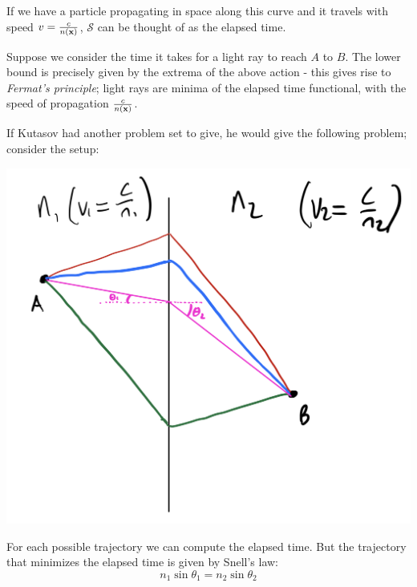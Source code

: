 If we have a particle propagating in space along this curve and it travels with speed $v = \frac{c}{n(\mathbf{x})}$, $\mathcal{S}$ can be thought of as the elapsed time.

Suppose we consider the time it takes for a light ray to reach $A$ to $B$. The lower bound is precisely given by the extrema of the above action - this gives rise to \emph{Fermat's principle}; light rays are minima of the elapsed time functional, with the speed of propagation $\frac{c}{n(\mathbf{x})}$.

If Kutasov had another problem set to give, he would give the following problem; consider the setup:

\begin{center}
    \includegraphics[scale=0.3]{Lectures/Images/lec17-snell.png}
\end{center}

For each possible trajectory we can compute the elapsed time. But the trajectory that minimizes the elapsed time is given by Snell's law:
\begin{equation}
    n_1\sin\theta_1 = n_2\sin\theta_2
\end{equation}

